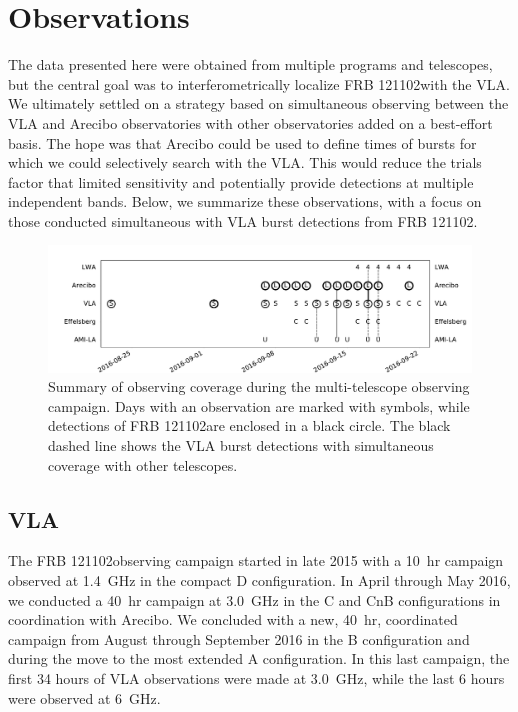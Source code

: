 \documentclass{emulateapj}
\newcommand{\frb}{FRB 121102}
\begin{document}
\section{Observations}
The data presented here were obtained from multiple programs and telescopes, but the central goal was to interferometrically localize \frb with the VLA. We ultimately settled on a strategy based on simultaneous observing between the VLA and Arecibo observatories with other observatories added on a best-effort basis. The hope was that Arecibo could be used to define times of bursts for which we could selectively search with the VLA. This would reduce the trials factor that limited sensitivity and potentially provide detections at multiple independent bands. Below, we summarize these observations, with a focus on those conducted simultaneous with VLA burst detections from \frb.

\begin{figure}[htb]
\begin{center}
\includegraphics[width=2\columnwidth]{timeline}
\caption{Summary of observing coverage during the multi-telescope observing campaign. Days with an observation are marked with symbols, while detections of \frb are enclosed in a black circle. The black dashed line shows the VLA burst detections with simultaneous coverage with other telescopes.
\label{fig:multi}}
\end{center}
\end{figure}

\subsection{VLA}
The \frb observing campaign started in late 2015 with a 10~hr campaign observed at 1.4~GHz in the compact D configuration. In April through May 2016, we conducted a 40~hr campaign at 3.0~GHz in the C and CnB configurations in coordination with Arecibo. We concluded with a new, 40~hr, coordinated campaign from August through September 2016 in the B configuration and during the move to the most extended A configuration. In this last campaign, the first 34 hours of VLA observations were made at 3.0~GHz, while the last 6 hours were observed at 6~GHz.
\end{document}
